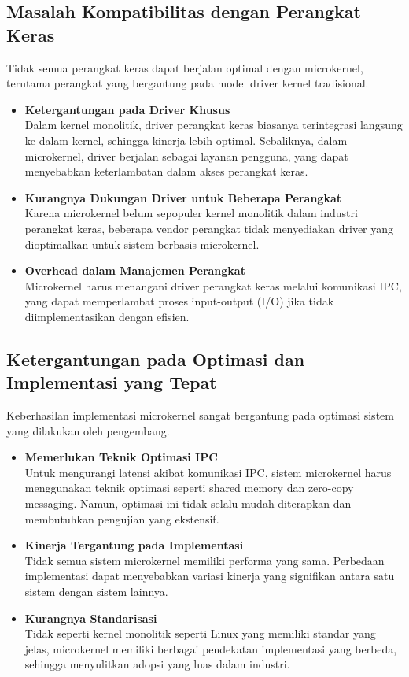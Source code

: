 \subsection{Masalah Kompatibilitas dengan Perangkat Keras}

Tidak semua perangkat keras dapat berjalan optimal dengan microkernel, terutama perangkat yang bergantung pada model driver kernel tradisional.

\begin{itemize}
	\item \textbf{Ketergantungan pada Driver Khusus} \\
	Dalam kernel monolitik, driver perangkat keras biasanya terintegrasi langsung ke dalam kernel, sehingga kinerja lebih optimal. Sebaliknya, dalam microkernel, driver berjalan sebagai layanan pengguna, yang dapat menyebabkan keterlambatan dalam akses perangkat keras.
	
	\item \textbf{Kurangnya Dukungan Driver untuk Beberapa Perangkat} \\
	Karena microkernel belum sepopuler kernel monolitik dalam industri perangkat keras, beberapa vendor perangkat tidak menyediakan driver yang dioptimalkan untuk sistem berbasis microkernel.
	
	\item \textbf{Overhead dalam Manajemen Perangkat} \\
	Microkernel harus menangani driver perangkat keras melalui komunikasi IPC, yang dapat memperlambat proses input-output (I/O) jika tidak diimplementasikan dengan efisien.
\end{itemize}

\subsection{Ketergantungan pada Optimasi dan Implementasi yang Tepat}

Keberhasilan implementasi microkernel sangat bergantung pada optimasi sistem yang dilakukan oleh pengembang.

\begin{itemize}
	\item \textbf{Memerlukan Teknik Optimasi IPC} \\
	Untuk mengurangi latensi akibat komunikasi IPC, sistem microkernel harus menggunakan teknik optimasi seperti shared memory dan zero-copy messaging. Namun, optimasi ini tidak selalu mudah diterapkan dan membutuhkan pengujian yang ekstensif.
	
	\item \textbf{Kinerja Tergantung pada Implementasi} \\
	Tidak semua sistem microkernel memiliki performa yang sama. Perbedaan implementasi dapat menyebabkan variasi kinerja yang signifikan antara satu sistem dengan sistem lainnya.
	
	\item \textbf{Kurangnya Standarisasi} \\
	Tidak seperti kernel monolitik seperti Linux yang memiliki standar yang jelas, microkernel memiliki berbagai pendekatan implementasi yang berbeda, sehingga menyulitkan adopsi yang luas dalam industri.
\end{itemize}

